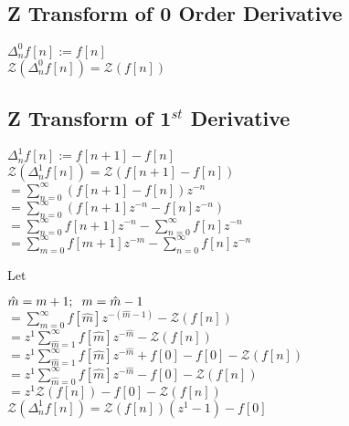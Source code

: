 \documentclass[11pt]{article}
\begin{document}
\subsection{Z Transform of 0 Order Derivative}
\begin{center}
\vspace{1mm}
$
\Delta_n^0 f[n] := f[n]
$
\\ \vspace{3mm}
$
\mathcal{Z}(\Delta_n^0 f[n]) = \mathcal{Z}(f[n])
$
\end{center}





\subsection{Z Transform of 1$^{st}$ Derivative}
\begin{center}
\vspace{1mm}
$
\Delta_n^1 f[n] := f[n+1] - f[n]
$
\\ \vspace{3mm}
$
\mathcal{Z}(\Delta_n^1 f[n]) = \mathcal{Z}(f[n+1] - f[n])
$
\\ \vspace{3mm}
$
= \sum_{n=0}^{\infty} (f[n+1] - f[n]) z^{-n}
$
\\ \vspace{3mm}
$
= \sum_{n=0}^{\infty} (f[n+1]z^{-n} - f[n] z^{-n})
$
\\ \vspace{3mm}
$
= \sum_{n=0}^{\infty} f[n+1]z^{-n} - \sum_{n=0}^{\infty} f[n] z^{-n}
$
\\ \vspace{3mm}
$
= \sum_{m=0}^{\infty} f[m+1]z^{-m} - \sum_{n=0}^{\infty} f[n] z^{-n}
$
\end{center}
Let 
\begin{center}
$
\hat{m} = m + 1; \hspace{2mm} m = \hat{m} - 1
$
\\ \vspace{3mm}
$
= \sum_{m=0}^{\infty} f[\hat{m}]z^{-(\hat{m}-1)} - \mathcal{Z}(f[n])
$
\\ \vspace{3mm}
$
= z^1 \sum_{\hat{m}=1}^{\infty} f[\hat{m}]z^{-\hat{m}} - \mathcal{Z}(f[n])
$
\\ \vspace{3mm}
$
= z^1 \sum_{\hat{m}=1}^{\infty} f[\hat{m}]z^{-\hat{m}} + f[0] - f[0] - \mathcal{Z}(f[n])
$
\\ \vspace{3mm}
$
= z^1 \sum_{\hat{m}=0}^{\infty} f[\hat{m}]z^{-\hat{m}} - f[0] - \mathcal{Z}(f[n])
$
\\ \vspace{3mm}
$
= z^1\mathcal{Z}(f[n]) - f[0] - \mathcal{Z}(f[n])
$
\\ \vspace{3mm}
$
\mathcal{Z}(\Delta_n^1 f[n]) = \mathcal{Z}(f[n])(z^1 - 1) - f[0]
$
\end{center}
\end{document}
